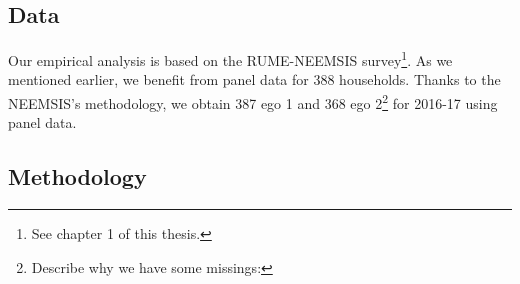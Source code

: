 \documentclass[a4paper, 11pt, onecolumn]{article}
\begin{document}

	\subsection{Data}

Our empirical analysis is based on the RUME-NEEMSIS survey\footnote{See chapter 1 of this thesis.}.
As we mentioned earlier, we benefit from panel data for 388 households.
Thanks to the NEEMSIS's methodology, we obtain 387 ego 1 and 368 ego 2\footnote{Describe why we have some missings: } for 2016-17 using panel data.




	\subsection{Methodology} \label{subsection:methodology}
\end{document}
